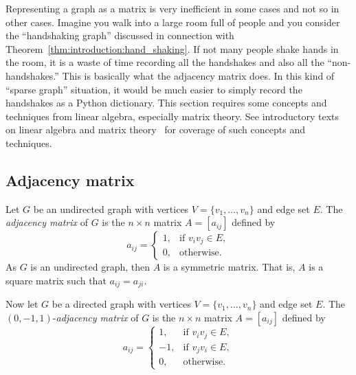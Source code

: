 Representing a graph as a matrix is very inefficient in some cases and
not so in other cases. Imagine you walk into a large room full of
people and you consider the ``handshaking graph'' discussed in
connection with Theorem~\ref{thm:introduction:hand_shaking}. If not
many people shake hands in the room, it is a waste of time recording
all the handshakes and also all the ``non-handshakes.'' This is
basically what the adjacency matrix does. In this kind of
``sparse graph'' situation, it would be much easier to simply record
the handshakes as a Python dictionary. This section requires some
concepts and techniques from linear algebra, especially matrix
theory. See introductory texts on linear algebra and matrix
theory~\cite{Beezer2009} for coverage of such concepts and techniques.



\subsection{Adjacency matrix}

Let $G$ be an undirected graph with vertices
$V = \{ v_1, \dots, v_n \}$ and edge set $E$. The
\emph{adjacency matrix} of $G$ is the $n \times n$ matrix
$A = [a_{ij}]$ defined by
\[
a_{ij}
=
\begin{cases}
1, & \text{if $v_i v_j \in E$}, \\
0, & \text{otherwise}.
\end{cases}
\]
As $G$ is an undirected graph, then $A$ is a symmetric matrix. That
is, $A$ is a square matrix such that $a_{ij} = a_{ji}$.

Now let $G$ be a directed graph with vertices
$V = \{ v_1, \dots, v_n \}$ and edge set $E$. The
$(0, -1, 1)$-\emph{adjacency matrix} of $G$ is the $n \times n$ matrix
$A = [a_{ij}]$ defined by
\[
a_{ij}
=
\begin{cases}
1,  & \text{if $v_i v_j \in E$}, \\
-1, & \text{if $v_j v_i \in E$}, \\
0,  & \text{otherwise}.
\end{cases}
\]

